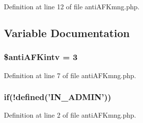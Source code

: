 Definition at line 12 of file anti\+A\+F\+Kmng.\+php.



\subsection{Variable Documentation}
\hypertarget{anti_a_f_kmng_8php_a679e2efdd85a1c8322fd78c550b9bcf9}{
\subsubsection[{\$anti\+A\+F\+Kintv}]{\setlength{\rightskip}{0pt plus 5cm}\$anti\+A\+F\+Kintv = 3}}\label{anti_a_f_kmng_8php_a679e2efdd85a1c8322fd78c550b9bcf9}


Definition at line 7 of file anti\+A\+F\+Kmng.\+php.

\hypertarget{anti_a_f_kmng_8php_af2283a34c6ab7d1765bee28a63bd3bd0}{
\subsubsection[{if}]{\setlength{\rightskip}{0pt plus 5cm}if(!defined('{\bf I\+N\+\_\+\+A\+D\+M\+I\+N}'))}}\label{anti_a_f_kmng_8php_af2283a34c6ab7d1765bee28a63bd3bd0}


Definition at line 2 of file anti\+A\+F\+Kmng.\+php.

